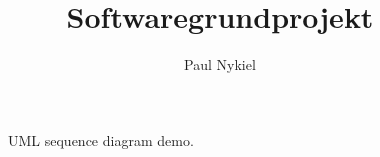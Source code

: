 \documentclass[DIN, pagenumber=false, fontsize=11pt, parskip=half]{scrartcl}
\title{Softwaregrundprojekt}
\author{Paul Nykiel}
\begin{document}
    
    
    \begin{figure}
      \centering

      \begin{sequencediagram}
      \end{sequencediagram}

      \caption{UML sequence diagram demo.}
    \end{figure}
\end{document}
